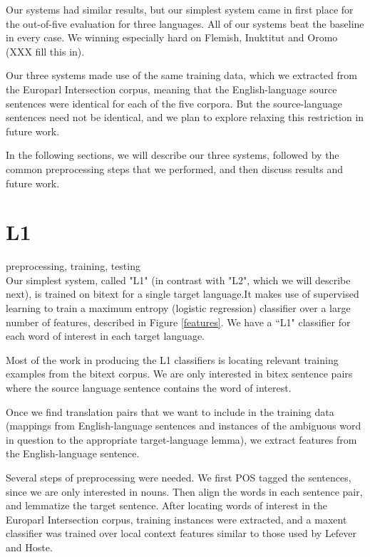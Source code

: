 \documentclass[11pt,letterpaper]{article}
\begin{document}
Our systems had similar results, but our simplest system came in first place
for the out-of-five evaluation for three languages. All of our systems beat the
baseline in every case.  We winning especially hard on Flemish, Inuktitut and
Oromo (XXX fill this in).

Our three systems made use of the same training data, which we extracted from
the Europarl Intersection corpus, meaning that the English-language source
sentences were identical for each of the five corpora. But the source-language
sentences need not be identical, and we plan to explore relaxing this
restriction in future work.

In the following sections, we will describe our three systems, followed by the
common preprocessing steps that we performed, and then discuss results and
future work.

\section{L1}
preprocessing, training, testing\\

Our simplest system, called "L1" (in contrast with "L2", which we will describe
next), is trained on bitext for a single target language.It makes use of
supervised learning to train a maximum entropy (logistic regression) classifier
over a large number of features, described in Figure \ref{features}. 
We have a ``L1" classifier for each word of interest in each target language.

Most of the work in producing the L1 classifiers is locating relevant training
examples from the bitext corpus. We are only interested in bitex sentence pairs
where the source language sentence contains the word of interest.

Once we find translation pairs that we want to include in the training data
(mappings from English-language sentences and instances of the ambiguous word
in question to the appropriate target-language lemma), we extract features from
the English-language sentence. 

Several steps of preprocessing were needed. We first POS tagged the sentences, since we are only interested in nouns.
Then align the words in each sentence pair, and lemmatize the target sentence.
After locating words of interest in the
Europarl Intersection corpus, training instances were extracted, and a maxent
classifier was trained over local context features similar to those used by Lefever and
Hoste.
\end{document}
